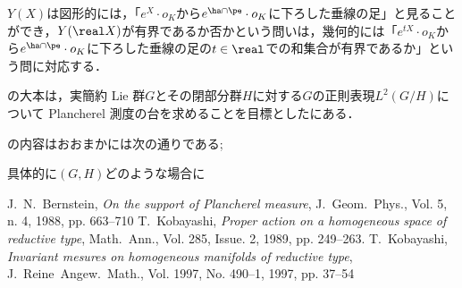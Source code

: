 \documentclass[12pt,dvipdfmx,uplatex]{jsarticle}
\begin{document}
$Y(X)$は図形的には，「$e^{X}\cdot o_K$から$e^{\ha\cap\pe}\cdot o_K $に下ろした垂線の足」と見ることができ，$Y(\real X) $が有界であるか否かという問いは，幾何的には「$e^{tX}\cdot o_K$から$e^{\ha\cap\pe}\cdot o_K $に下ろした垂線の足の$t\in \real$での和集合が有界であるか」という問に対応する．

の大本は，実簡約 Lie 群$G$とその閉部分群$H$に対する$G$の正則表現$L^2(G/H)$について Plancherel 測度の台を求めることを目標とした\cite{ber88}にある．

\cite{ber88}の内容はおおまかには次の通りである; 


具体的に$(G,H) $どのような場合に

    

\begin{thebibliography}{99}
 J.~N.~Bernstein, \textit{On the support of Plancherel measure}, J.~Geom.~Phys., Vol. 5, n. 4, 1988, pp. 663--710
 T.~Kobayashi, 
  \textit{Proper action on a homogeneous space of reductive type},
  Math.~Ann., Vol. 285, Issue. 2, 1989, pp. 249--263.  
 T.~Kobayashi, \textit{Invariant mesures on homogeneous manifolds of reductive type}, J.~Reine~Angew.~Math., Vol. 1997, No. 490--1, 1997, pp. 37--54

\end{thebibliography}
\end{document}
